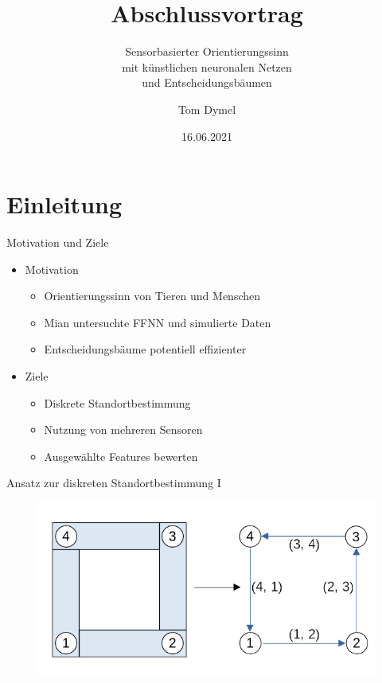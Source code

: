 \documentclass[10pt]{beamer}
\title{Abschlussvortrag}
\subtitle{Sensorbasierter Orientierungssinn\\mit künstlichen neuronalen Netzen\\und Entscheidungsbäumen}
\date{16.06.2021}
\author{Tom Dymel}
\institute{Masterarbeit\\Technische Universität Hamburg}
\begin{document}
\maketitle

\section{Einleitung}
\begin{frame}{Motivation und Ziele}
\begin{itemize}
    \item Motivation
    \begin{itemize}
        \item Orientierungssinn von Tieren und Menschen
        \item Mian untersuchte FFNN und simulierte Daten
        \item Entscheidungsbäume potentiell effizienter
    \end{itemize}
    \item Ziele
    \begin{itemize}
        \item Diskrete Standortbestimmung %
        \item Nutzung von mehreren Sensoren
        \item Ausgewählte Features bewerten
    \end{itemize}
\end{itemize}
\end{frame}

\begin{frame}{Ansatz zur diskreten Standortbestimmung I}
    \begin{figure}
        \centering
        \includegraphics[width=\linewidth]{model/location_encoding.png}
    \end{figure}
\end{frame}
\end{document}
